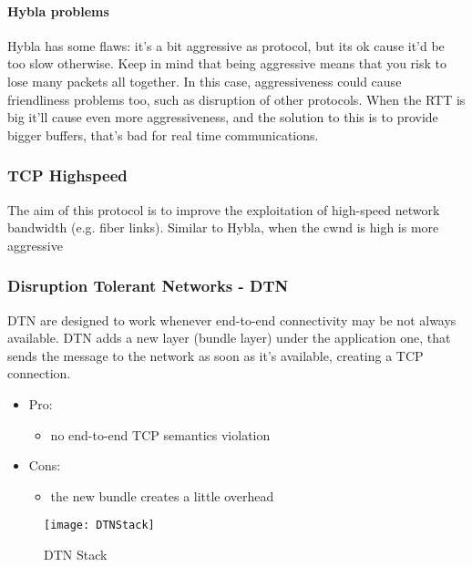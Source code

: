 \paragraph*{Hybla problems} Hybla has some flaws: it's a bit aggressive as
protocol, but its ok cause it'd be too slow otherwise. Keep in mind that being
aggressive means that you risk to lose many packets all together. In this case,
aggressiveness could cause friendliness problems too, such as disruption of
other protocols.
When the RTT is big it'll cause even more aggressiveness, and the solution to
this is to provide bigger buffers, that's bad for real time communications.

\subsubsection{TCP Highspeed}
The aim of this protocol is to improve the exploitation of high-speed network
bandwidth (e.g. fiber links). Similar to Hybla, when the cwnd is high is more
aggressive

\subsubsection{Disruption Tolerant Networks - DTN}
DTN are designed to work whenever end-to-end connectivity may be not always
available. DTN adds a new layer (bundle layer) under the application one, that
sends the message to the network as soon as it's available, creating a TCP
connection.
\begin{itemize}
\item Pro:
  \begin{itemize}
    \item no end-to-end TCP semantics violation
  \end{itemize}
\item Cons:
  \begin{itemize}
    \item the new bundle creates a little overhead
  \end{itemize}
\end{itemize}

\begin{figure}[t]
  \centering
  \texttt{[image: DTNStack]}
  \caption{DTN Stack}
\end{figure}

